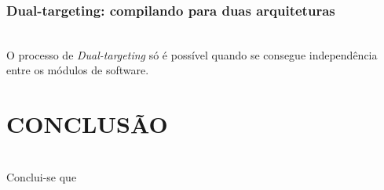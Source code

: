 \documentclass[times, twoside, watermark]{artigo}
\begin{document}
\subsubsection{Dual-targeting: compilando para duas arquiteturas}\hfill\\

O processo de \textit{Dual-targeting} só é possível quando se consegue independência
entre os módulos de software.





\section{CONCLUSÃO}\hfill\\
Conclui-se que



\end{document}
